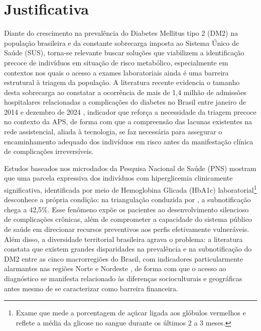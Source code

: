 \section{Justificativa}

Diante do crescimento na prevalência do Diabetes Mellitus tipo 2 (DM2) na população brasileira e da constante sobrecarga imposta ao Sistema Único de Saúde (SUS), torna-se relevante buscar soluções que viabilizem a identificação precoce de indivíduos em situação de risco metabólico, especialmente em contextos nos quais o acesso a exames laboratoriais ainda é uma barreira estrutural à triagem da população. A literatura recente evidencia o tamanho desta sobrecarga ao constatar a ocorrência de mais de 1,4 milhão de admissões hospitalares relacionadas a complicações do diabetes no Brasil entre janeiro de 2014 e dezembro de 2024 \cite{bezerra2025morbidade}, indicador que reforça a necessidade da triagem precoce no contexto da APS, de forma com que a compreensão das lacunas existentes na rede assistencial, aliada à tecnologia, se faz necessária para assegurar o encaminhamento adequado dos indivíduos em risco antes da manifestação clínica de complicações irreversíveis.

Estudos baseados nos microdados da Pesquisa Nacional de Saúde (PNS) mostram que uma parcela expressiva dos indivíduos com hiperglicemia clinicamente significativa, identificada por meio de Hemoglobina Glicada (HbA1c) laboratorial\footnote{Exame que mede a porcentagem de açúcar ligada aos glóbulos vermelhos e reflete a média da glicose no sangue durante os últimos 2 a 3 meses.} desconhece a própria condição: na triangulação conduzida por \textcite{muzy2021prevalencia}, a subnotificação chega a 42,5\%. Esse fenômeno expõe os pacientes ao desenvolvimento silencioso de complicações crônicas, além de comprometer a capacidade do sistema público de saúde em direcionar recursos preventivos aos perfis efetivamente vulneráveis. Além disso, a diversidade territorial brasileira agrava o problema: a literatura constata que existem grandes disparidades na prevalência e na subnotificação do DM2 entre as cinco macrorregiões do Brasil, com indicadores particularmente alarmantes nas regiões Norte e Nordeste \cite{deAlmeida-Pititto09112015, iser2015prevalencia}, de forma com que o acesso ao diagnóstico se manifesta relacionado às diferenças socioculturais e geográficas antes mesmo de se caracterizar como barreira financeira.

